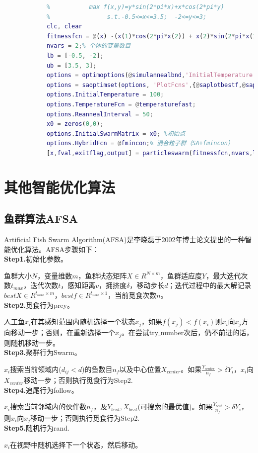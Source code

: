             \begin{lstlisting}[language=Matlab]
            %% matlab自带的SA求解“智能优化引例”
            %           max f(x,y)=y*sin(2*pi*x)+x*cos(2*pi*y)
            %                s.t.-0.5<=x<=3.5;  -2<=y<=3;
            clc, clear
            fitnessfcn = @(x) -(x(1)*cos(2*pi*x(2)) + x(2)*sin(2*pi*x(1))); % 适应度函数句柄
            nvars = 2;% 个体的变量数目
            lb = [-0.5, -2];
            ub = [3.5, 3];
            options = optimoptions(@simulannealbnd,'InitialTemperature',[300 50]);
            options = saoptimset(options, 'PlotFcns',{@saplotbestf,@saplottemperature,@saplotf,@saplotstopping});
            options.InitialTemperature = 100;
            options.TemperatureFcn = @temperaturefast;
            options.ReannealInterval = 50;
            x0 = zeros(0,0);
            options.InitialSwarmMatrix = x0; %初始点
            options.HybridFcn = @fmincon;% 混合粒子群（SA+fmincon）
            [x,fval,exitflag,output] = particleswarm(fitnessfcn,nvars,lb,ub,options)
            \end{lstlisting}

\section{其他智能优化算法}
    \subsection{鱼群算法AFSA}
        \par
        Artificial Fish Swarm Algorithm(AFSA)是李晓磊于2002年博士论文提出的一种智能优化算法。AFSA步骤如下：\\
        \textbf{Step1.}初始化参数。
        \par
        鱼群大小$N$，变量维数$m$，鱼群状态矩阵$X\in R^{N\times m}$，鱼群适应度$Y$，最大迭代次数$t_{max}$，迭代次数$t$，感知距离$v$，拥挤度$\delta$，移动步长$d$；迭代过程中的最大解记录$bestX\in R^{t_{max}\times m}$，$bestf \in R^{t_{max}\times 1}$，当前觅食次数$n$。\\
        \textbf{Step2.}觅食行为prey。
        \par
        人工鱼$x_i$在其感知范围内随机选择一个状态$x_j$，如果$f(x_j)<f(x_i)$则$x_i$向$x_j$方向移动一步；否则，在重新选择一个$x_j$。在尝试try$\_$number次后，仍不前进的话，则随机移动一步。\\
        \textbf{Step3.}聚群行为Swarm。
        \par
        $x_i$搜索当前领域内($d_{ij}<d$)的鱼数目$n_f$以及中心位置$X_{center}$。如果$\frac{Y_{center}}{n_f}>\delta Y_i$，$x_i$向$X_{center}$移动一步；否则执行觅食行为Step2.\\
        \textbf{Step4.}追尾行为follow。
        \par
        $x_i$搜索当前邻域内的伙伴数$n_f$，及$Y_{best},X_{best}$(可搜索的最优值)。如果$\frac{Y_{best}}{n_f}>\delta Y_i$，则$x_i$向$x_j$移动一步；否则执行觅食行为Step2.\\
        \textbf{Step5.}随机行为rand.
        \par
        $x_i$在视野中随机选择下一个状态，然后移动。

